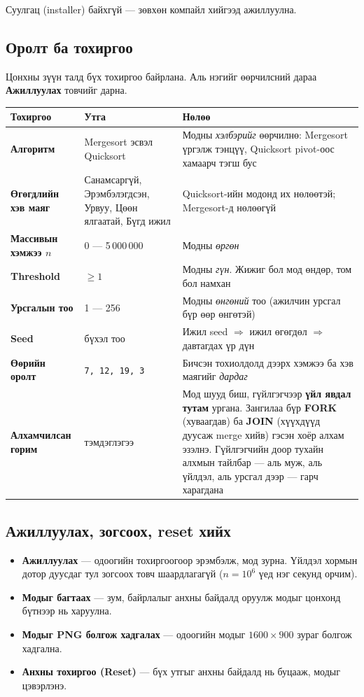 \documentclass[11pt,a4paper]{article}
\begin{document}
Суулгац (installer) байхгүй --- зөвхөн компайл хийгээд ажиллуулна.

\subsection{Оролт ба тохиргоо}
Цонхны зүүн талд бүх тохиргоо байрлана. Аль нэгийг өөрчилсний дараа
\textbf{Ажиллуулах} товчийг дарна.

\begin{center}
\small
\begin{tabular}{L{3.4cm}L{5.0cm}L{6.0cm}}
\toprule
Тохиргоо & Утга & Нөлөө \\
\midrule
\textbf{Алгоритм} & Mergesort эсвэл Quicksort &
Модны \emph{хэлбэрийг} өөрчилнө: Mergesort үргэлж тэнцүү, Quicksort
pivot-оос хамаарч тэгш бус \\
\textbf{Өгөгдлийн хэв маяг} & Санамсаргүй, Эрэмбэлэгдсэн, Урвуу,
Цөөн ялгаатай, Бүгд ижил &
Quicksort-ийн модонд их нөлөөтэй; Mergesort-д нөлөөгүй \\
\textbf{Массивын хэмжээ $n$} & 0 --- 5\,000\,000 &
Модны \emph{өргөн} \\
\textbf{Threshold} & $\ge 1$ &
Модны \emph{гүн}. Жижиг бол мод өндөр, том бол намхан \\
\textbf{Урсгалын тоо} & 1 --- 256 &
Модны \emph{өнгөний} тоо (ажилчин урсгал бүр өөр өнгөтэй) \\
\textbf{Seed} & бүхэл тоо &
Ижил seed $\Rightarrow$ ижил өгөгдөл $\Rightarrow$ давтагдах үр дүн \\
\textbf{Өөрийн оролт} & \texttt{7, 12, 19, 3} &
Бичсэн тохиолдолд дээрх хэмжээ ба хэв маягийг \emph{дардаг} \\
\textbf{Алхамчилсан горим} & тэмдэглэгээ &
Мод шууд биш, гүйлгэгчээр \textbf{үйл явдал тутам} ургана. Зангилаа бүр
\textbf{FORK} (хуваагдав) ба \textbf{JOIN} (хүүхдүүд дуусаж merge хийв) гэсэн
хоёр алхам эзэлнэ. Гүйлгэгчийн доор тухайн алхмын тайлбар --- аль муж, аль
үйлдэл, аль урсгал дээр --- гарч харагдана \\
\bottomrule
\end{tabular}
\end{center}

\subsection{Ажиллуулах, зогсоох, reset хийх}
\begin{itemize}[nosep,leftmargin=*]
  \item \textbf{Ажиллуулах} --- одоогийн тохиргоогоор эрэмбэлж, мод зурна.
        Үйлдэл хормын дотор дуусдаг тул зогсоох товч шаардлагагүй
        ($n = 10^6$ үед нэг секунд орчим).
  \item \textbf{Модыг багтаах} --- зум, байрлалыг анхны байдалд оруулж модыг
        цонхонд бүтнээр нь харуулна.
  \item \textbf{Модыг PNG болгож хадгалах} --- одоогийн модыг $1600\times900$
        зураг болгож хадгална.
  \item \textbf{Анхны тохиргоо (Reset)} --- бүх утгыг анхны байдалд нь
        буцааж, модыг цэвэрлэнэ.
\end{itemize}
\end{document}
